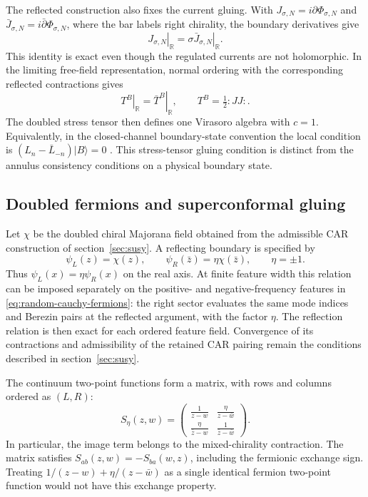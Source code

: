 The reflected construction also fixes the current gluing.  With
$J_{\sigma,N}=i\partial\Phi_{\sigma,N}$ and
$\bar J_{\sigma,N}=i\bar\partial\Phi_{\sigma,N}$, where the bar labels
right chirality, the boundary derivatives give
\begin{equation}
\left.J_{\sigma,N}\right|_{\mathbb R}
=\left.\sigma\bar J_{\sigma,N}\right|_{\mathbb R}.
\label{eq:boundary-current-gluing}
\end{equation}
This identity is exact even though the regulated currents are not
holomorphic.  In the limiting free-field representation, normal ordering
with the corresponding reflected contractions gives
\begin{equation}
\left.T^B\right|_{\mathbb R}
=\left.\bar T^B\right|_{\mathbb R},
\qquad T^B=\tfrac12:JJ:.
\label{eq:boundary-stress-gluing}
\end{equation}
The doubled stress tensor then defines one Virasoro algebra with $c=1$.
Equivalently, in the closed-channel boundary-state convention the local
condition is $(L_n-\bar L_{-n})|B\rangle=0$
\cite{Cardy:2004hm}.  This stress-tensor gluing condition is distinct from
the annulus consistency conditions on a physical boundary state.

\subsection{Doubled fermions and superconformal gluing}

Let $\chi$ be the doubled chiral Majorana field obtained from the admissible
CAR construction of section~\ref{sec:susy}.  A reflecting boundary is
specified by
\begin{equation}
\psi_L(z)=\chi(z),\qquad
\psi_R(\bar z)=\eta\chi(\bar z),\qquad \eta=\pm1.
\label{eq:boundary-doubled-fermion}
\end{equation}
Thus $\psi_L(x)=\eta\psi_R(x)$ on the real axis.  At finite feature
width this relation can be imposed separately on the positive- and
negative-frequency features in
\eqref{eq:random-cauchy-fermions}: the right sector evaluates the same mode
indices and Berezin pairs at the reflected argument, with the factor
$\eta$.  The reflection relation is then exact for each ordered feature
field.  Convergence of its contractions and admissibility of the retained
CAR pairing remain the conditions described in section~\ref{sec:susy}.

The continuum two-point functions form a matrix, with rows and columns
ordered as $(L,R)$:
\begin{equation}
S_\eta(z,w)=
\begin{pmatrix}
\displaystyle\frac1{z-w}&\displaystyle\frac{\eta}{z-\bar w}\\[6pt]
\displaystyle\frac{\eta}{\bar z-w}&
\displaystyle\frac1{\bar z-\bar w}
\end{pmatrix}.
\label{eq:boundary-fermion-matrix}
\end{equation}
In particular, the image term belongs to the mixed-chirality contraction.
The matrix satisfies $S_{ab}(z,w)=-S_{ba}(w,z)$, including the fermionic
exchange sign.  Treating $1/(z-w)+\eta/(z-\bar w)$ as a single identical
fermion two-point function would not have this exchange property.

